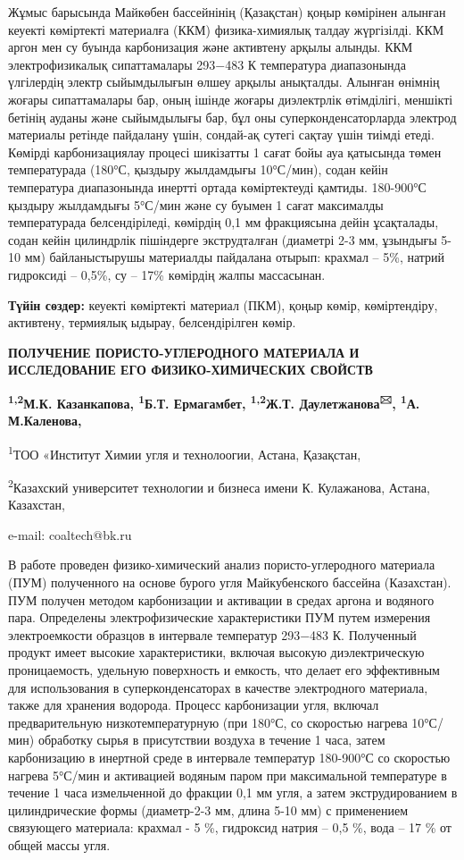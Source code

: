 Жұмыс барысында Майкөбен бассейнінің (Қазақстан) қоңыр көмірінен алынған
кеуекті көміртекті материалға (ККМ) физика-химиялық талдау жүргізілді.
ККМ аргон мен су буында карбонизация және активтену арқылы алынды. ККМ
электрофизикалық сипаттамалары 293−483 К температура диапазонында
үлгілердің электр сыйымдылығын өлшеу арқылы анықталды. Алынған өнімнің
жоғары сипаттамалары бар, оның ішінде жоғары диэлектрлік өтімділігі,
меншікті бетінің ауданы және сыйымдылығы бар, бұл оны
суперконденсаторларда электрод материалы ретінде пайдалану үшін,
сондай-ақ сутегі сақтау үшін тиімді етеді. Көмірді карбонизациялау
процесі шикізатты 1 сағат бойы ауа қатысында төмен температурада (180°С,
қыздыру жылдамдығы 10°С/мин), содан кейін температура диапазонында
инертті ортада көміртектеуді қамтиды. 180-900°С қыздыру жылдамдығы
5°С/мин және су буымен 1 сағат максималды температурада белсендіріледі,
көмірдің 0,1 мм фракциясына дейін ұсақталады, содан кейін цилиндрлік
пішіндерге экструдталған (диаметрі 2-3 мм, ұзындығы 5-10 мм)
байланыстырушы материалды пайдалана отырып: крахмал -- 5\%, натрий
гидроксиді -- 0,5\%, су -- 17\% көмірдің жалпы массасынан.

{\bfseries Түйін сөздер:} кеуекті көміртекті материал (ПКМ), қоңыр көмір,
көміртендіру, активтену, термиялық ыдырау, белсендірілген көмір.

\begin{center}
{\large\bfseries ПОЛУЧЕНИЕ ПОРИСТО-УГЛЕРОДНОГО МАТЕРИАЛА И ИССЛЕДОВАНИЕ ЕГО
ФИЗИКО-ХИМИЧЕСКИХ СВОЙСТВ}

{\bfseries \textsuperscript{1,2}М.К. Казанкапова, \textsuperscript{1}Б.Т.
Ермагамбет, \textsuperscript{1,2}Ж.Т. Даулетжанова\textsuperscript{🖂},
\textsuperscript{1}А. М.Каленова,}

\textsuperscript{1}ТОО «Институт Химии угля и технолоогии, Астана,
Қазақстан,

\textsuperscript{2}Казахский университет технологии и бизнеса имени К.
Кулажанова, Астана, Казахстан,

e-mail: coaltech@bk.ru
\end{center}

В работе проведен физико-химический анализ пористо-углеродного материала
(ПУМ) полученного на основе бурого угля Майкубенского бассейна
(Казахстан). ПУМ получен методом карбонизации и активации в средах
аргона и водяного пара. Определены электрофизические характеристики ПУМ
путем измерения электроемкости образцов в интервале температур 293−483
К. Полученный продукт имеет высокие характеристики, включая высокую
диэлектрическую проницаемость, удельную поверхность и емкость, что
делает его эффективным для использования в суперконденсаторах в качестве
электродного материала, также для хранения водорода. Процесс
карбонизации угля, включал предварительную низкотемпературную (при
180°С, со скоростью нагрева 10°С/мин) обработку сырья в присутствии
воздуха в течение 1 часа, затем карбонизацию в инертной среде в
интервале температур 180-900°С со скоростью нагрева 5°С/мин и активацией
водяным паром при максимальной температуре в течение 1 часа измельченной
до фракции 0,1 мм угля, а затем экструдированием в цилиндрические формы
(диаметр-2-3 мм, длина 5-10 мм) с применением связующего материала:
крахмал - 5 \%, гидроксид натрия -- 0,5 \%, вода -- 17 \% от общей массы
угля.

